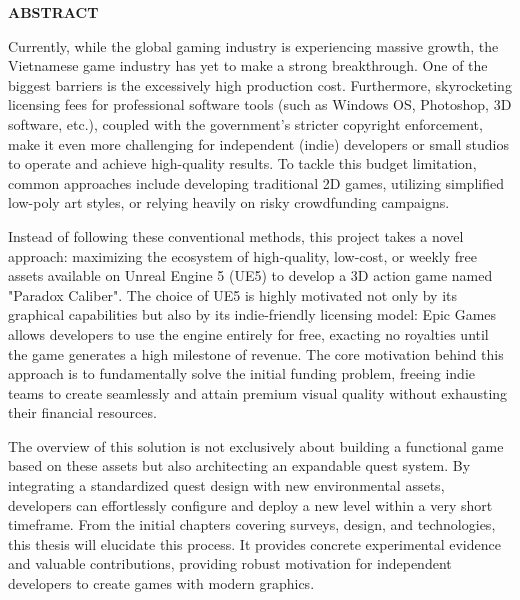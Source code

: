 \documentclass[../DoAn.tex]{subfiles}
\begin{document}
\begin{center}
    \Large{\textbf{ABSTRACT}}\\
\end{center}
\vspace{1cm}
\hspace{\parindent}Currently, while the global gaming industry is experiencing massive growth, the Vietnamese game industry has yet to make a strong breakthrough. One of the biggest barriers is the excessively high production cost. Furthermore, skyrocketing licensing fees for professional software tools (such as Windows OS, Photoshop, 3D software, etc.), coupled with the government's stricter copyright enforcement, make it even more challenging for independent (indie) developers or small studios to operate and achieve high-quality results. To tackle this budget limitation, common approaches include developing traditional 2D games, utilizing simplified low-poly art styles, or relying heavily on risky crowdfunding campaigns.

Instead of following these conventional methods, this project takes a novel approach: maximizing the ecosystem of high-quality, low-cost, or weekly free assets available on Unreal Engine 5 (UE5) to develop a 3D action game named "Paradox Caliber". The choice of UE5 is highly motivated not only by its graphical capabilities but also by its indie-friendly licensing model: Epic Games allows developers to use the engine entirely for free, exacting no royalties until the game generates a high milestone of revenue. The core motivation behind this approach is to fundamentally solve the initial funding problem, freeing indie teams to create seamlessly and attain premium visual quality without exhausting their financial resources.

The overview of this solution is not exclusively about building a functional game based on these assets but also architecting an expandable quest system. By integrating a standardized quest design with new environmental assets, developers can effortlessly configure and deploy a new level within a very short timeframe. From the initial chapters covering surveys, design, and technologies, this thesis will elucidate this process. It provides concrete experimental evidence and valuable contributions, providing robust motivation for independent developers to create games with modern graphics.
\end{document}
